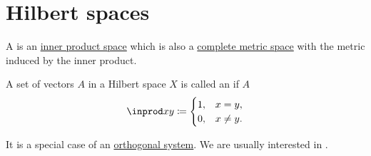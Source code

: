 \section{Hilbert spaces}\label{sec:hilbert_spaces}

\begin{definition}\label{def:hilbert_space}
  A  is an \hyperref[def:inner_product_space]{inner product space} which is also a \hyperref[def:complete_metric_space]{complete metric space} with the metric induced by the inner product.
\end{definition}

\begin{definition}\label{def:orthonormal_system}
  A set of vectors \( A \) in a Hilbert space \( X \) is called an  if \( A \)
  \begin{equation*}
    \inprod x y \coloneqq \begin{cases}
      1, & x = y,    \\
      0, & x \neq y.
    \end{cases}
  \end{equation*}

  It is a special case of an \hyperref[def:orthogonality]{orthogonal system}. We are usually interested in .
\end{definition}
